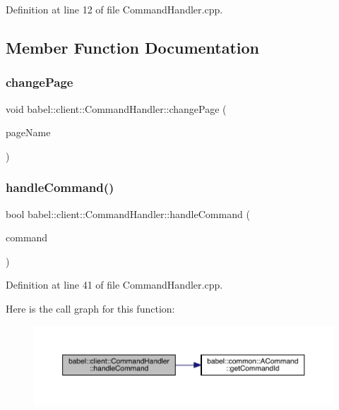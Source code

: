 Definition at line 12 of file Command\+Handler.\+cpp.



\subsection{Member Function Documentation}
\mbox{\label{classbabel_1_1client_1_1_command_handler_adfe2c7e5fbed541db090140a24830f2d}} 
\subsubsection{\texorpdfstring{change\+Page}{changePage}}
{\footnotesize\ttfamily void babel\+::client\+::\+Command\+Handler\+::change\+Page (\begin{DoxyParamCaption}\item[{std\+::string}]{page\+Name }\end{DoxyParamCaption})\hspace{0.3cm}{\ttfamily [signal]}}

\mbox{\label{classbabel_1_1client_1_1_command_handler_afd1572be08e6a1a8c90cb90f47174e06}} 
\subsubsection{\texorpdfstring{handle\+Command()}{handleCommand()}}
{\footnotesize\ttfamily bool babel\+::client\+::\+Command\+Handler\+::handle\+Command (\begin{DoxyParamCaption}\item[{\mbox{\hyperlink{classbabel_1_1common_1_1_a_command}{common\+::\+A\+Command}}}]{command }\end{DoxyParamCaption})}



Definition at line 41 of file Command\+Handler.\+cpp.

Here is the call graph for this function\+:\nopagebreak
\begin{figure}[H]
\begin{center}
\leavevmode
\includegraphics[width=350pt]{classbabel_1_1client_1_1_command_handler_afd1572be08e6a1a8c90cb90f47174e06_cgraph}
\end{center}
\end{figure}


